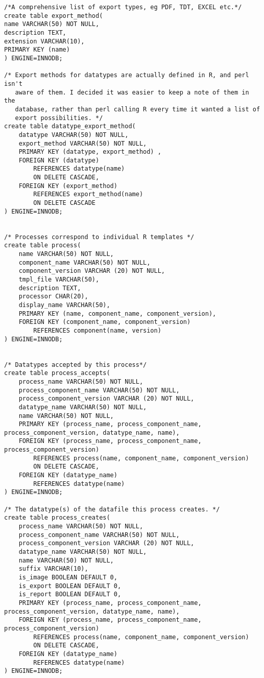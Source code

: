 \begin{tiny}
\begin{verbatim}
/*A comprehensive list of export types, eg PDF, TDT, EXCEL etc.*/
create table export_method(
name VARCHAR(50) NOT NULL,
description TEXT,
extension VARCHAR(10),
PRIMARY KEY (name)
) ENGINE=INNODB;

/* Export methods for datatypes are actually defined in R, and perl isn't
   aware of them. I decided it was easier to keep a note of them in the 
   database, rather than perl calling R every time it wanted a list of 
   export possibilities. */
create table datatype_export_method(
	datatype VARCHAR(50) NOT NULL,
	export_method VARCHAR(50) NOT NULL,
	PRIMARY KEY (datatype, export_method) ,
	FOREIGN KEY (datatype) 
		REFERENCES datatype(name) 
		ON DELETE CASCADE,
	FOREIGN KEY (export_method) 
		REFERENCES export_method(name) 
		ON DELETE CASCADE
) ENGINE=INNODB;


/* Processes correspond to individual R templates */
create table process(
	name VARCHAR(50) NOT NULL,
	component_name VARCHAR(50) NOT NULL,
	component_version VARCHAR (20) NOT NULL,
	tmpl_file VARCHAR(50),
	description TEXT,
	processor CHAR(20),
	display_name VARCHAR(50),
	PRIMARY KEY (name, component_name, component_version),
	FOREIGN KEY (component_name, component_version)
		REFERENCES component(name, version)
) ENGINE=INNODB;


/* Datatypes accepted by this process*/
create table process_accepts(
	process_name VARCHAR(50) NOT NULL,
	process_component_name VARCHAR(50) NOT NULL,
	process_component_version VARCHAR (20) NOT NULL,
	datatype_name VARCHAR(50) NOT NULL,
	name VARCHAR(50) NOT NULL,
	PRIMARY KEY (process_name, process_component_name, process_component_version, datatype_name, name),
	FOREIGN KEY (process_name, process_component_name, process_component_version) 
		REFERENCES process(name, component_name, component_version) 
		ON DELETE CASCADE,
	FOREIGN KEY (datatype_name) 
		REFERENCES datatype(name)
) ENGINE=INNODB;

/* The datatype(s) of the datafile this process creates. */
create table process_creates(
	process_name VARCHAR(50) NOT NULL,
	process_component_name VARCHAR(50) NOT NULL,
	process_component_version VARCHAR (20) NOT NULL,
	datatype_name VARCHAR(50) NOT NULL,
	name VARCHAR(50) NOT NULL,
	suffix VARCHAR(10),
	is_image BOOLEAN DEFAULT 0,
	is_export BOOLEAN DEFAULT 0,
	is_report BOOLEAN DEFAULT 0,
	PRIMARY KEY (process_name, process_component_name, process_component_version, datatype_name, name),
	FOREIGN KEY (process_name, process_component_name, process_component_version) 
		REFERENCES process(name, component_name, component_version) 
		ON DELETE CASCADE,
	FOREIGN KEY (datatype_name) 
		REFERENCES datatype(name)
) ENGINE=INNODB;


\end{verbatim}
\end{tiny}
